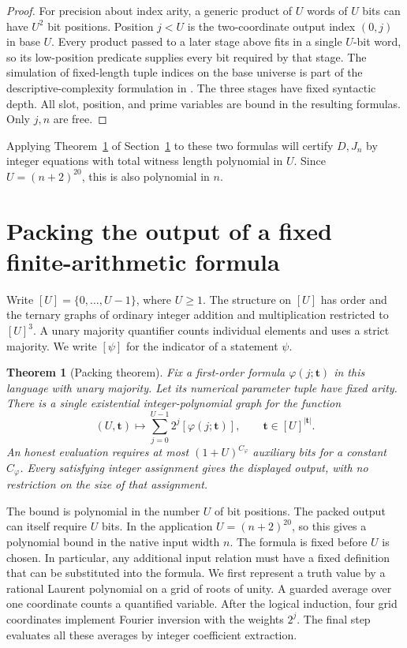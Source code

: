 \documentclass[11pt,letterpaper]{article}
\newtheorem{theorem}{Theorem}[section]
\numberwithin{equation}{section}
\begin{document}
\begin{proof}
For precision about index arity, a generic product of \(U\) words of
\(U\) bits can have \(U^2\) bit positions. Position \(j<U\) is the
two-coordinate output index \((0,j)\) in base \(U\). Every product
passed to a later stage above fits in a single \(U\)-bit word, so its
low-position predicate supplies every bit required by that stage.
The simulation of fixed-length tuple indices on the base universe is
part of the descriptive-complexity formulation in \cite[Section~2.3]{hab}.
The three stages have fixed syntactic depth. All slot, position, and
prime variables are bound in the resulting formulas. Only \(j,n\) are
free.
\end{proof}

Applying Theorem~\ref{thm:unarycompiler} of
Section~\ref{sec:unarycompiler} to these two formulas will certify
\(D,J_n\) by integer equations with total witness length polynomial in
\(U\). Since \(U=(n+2)^{20}\), this is also polynomial in \(n\).

\section{Packing the output of a fixed finite-arithmetic formula}
\label{sec:unarycompiler}

Write $[U]=\{0,\ldots,U-1\}$, where $U\ge1$. The structure on $[U]$
has order and the ternary graphs of ordinary integer addition and
multiplication restricted to $[U]^3$. A unary majority quantifier counts
individual elements and uses a strict majority. We write $[\psi]$ for
the indicator of a statement $\psi$.

\begin{theorem}[Packing theorem]\label{thm:unarycompiler}
Fix a first-order formula $\varphi(j;\mathbf t)$ in this language with
unary majority. Let its numerical parameter tuple have fixed arity. There is a
single existential integer-polynomial graph for the function
\[
 (U,\mathbf t)\longmapsto \sum_{j=0}^{U-1}2^j[\varphi(j;\mathbf t)],
 \qquad \mathbf t\in[U]^{|\mathbf t|}.
\]
An honest evaluation requires at most $(1+U)^{C_\varphi}$ auxiliary
bits for a constant $C_\varphi$. Every satisfying integer assignment
gives the displayed output, with no restriction on the size of that
assignment.
\end{theorem}

The bound is polynomial in the number $U$ of bit positions. The packed output can itself require $U$ bits. In the application $U=(n+2)^{20}$, so this gives a polynomial bound in the native input width $n$. The formula is fixed before $U$ is chosen. In particular, any additional
input relation must have a fixed definition that can be substituted into
the formula. We first represent a truth value by a rational Laurent
polynomial on a grid of roots of unity. A guarded average over one
coordinate counts a quantified variable. After the logical induction,
four grid coordinates implement Fourier inversion with the weights $2^j$. The final step
evaluates all these averages by integer coefficient extraction.
\end{document}
